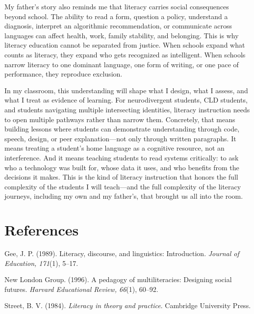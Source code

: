 \documentclass[11pt]{article}
\begin{document}
My father's story also reminds me that literacy carries social consequences beyond school. The ability to read a form, question a policy, understand a diagnosis, interpret an algorithmic recommendation, or communicate across languages can affect health, work, family stability, and belonging. This is why literacy education cannot be separated from justice. When schools expand what counts as literacy, they expand who gets recognized as intelligent. When schools narrow literacy to one dominant language, one form of writing, or one pace of performance, they reproduce exclusion.

In my classroom, this understanding will shape what I design, what I assess, and what I treat as evidence of learning. For neurodivergent students, CLD students, and students navigating multiple intersecting identities, literacy instruction needs to open multiple pathways rather than narrow them. Concretely, that means building lessons where students can demonstrate understanding through code, speech, design, or peer explanation---not only through written paragraphs. It means treating a student's home language as a cognitive resource, not an interference. And it means teaching students to read systems critically: to ask who a technology was built for, whose data it uses, and who benefits from the decisions it makes. This is the kind of literacy instruction that honors the full complexity of the students I will teach---and the full complexity of the literacy journeys, including my own and my father's, that brought us all into the room.

\section*{References}

Gee, J. P. (1989). Literacy, discourse, and linguistics: Introduction. \textit{Journal of Education, 171}(1), 5--17.

New London Group. (1996). A pedagogy of multiliteracies: Designing social futures. \textit{Harvard Educational Review, 66}(1), 60--92.

Street, B. V. (1984). \textit{Literacy in theory and practice}. Cambridge University Press.
\end{document}
